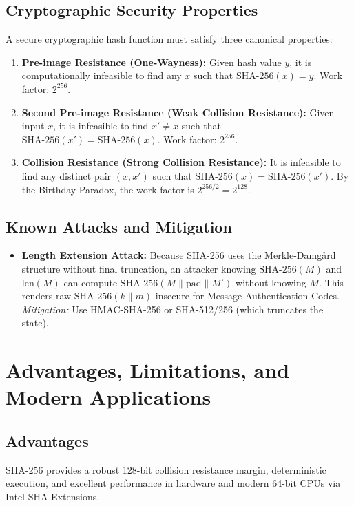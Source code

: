 \subsection{Cryptographic Security Properties}
A secure cryptographic hash function must satisfy three canonical properties:
\begin{enumerate}
    \item \textbf{Pre-image Resistance (One-Wayness):} Given hash value $y$, it is computationally infeasible to find any $x$ such that $\text{SHA-256}(x) = y$. Work factor: $2^{256}$.
    \item \textbf{Second Pre-image Resistance (Weak Collision Resistance):} Given input $x$, it is infeasible to find $x' \ne x$ such that $\text{SHA-256}(x') = \text{SHA-256}(x)$. Work factor: $2^{256}$.
    \item \textbf{Collision Resistance (Strong Collision Resistance):} It is infeasible to find any distinct pair $(x, x')$ such that $\text{SHA-256}(x) = \text{SHA-256}(x')$. By the Birthday Paradox, the work factor is $2^{256/2} = 2^{128}$.
\end{enumerate}

\subsection{Known Attacks and Mitigation}
\begin{itemize}
    \item \textbf{Length Extension Attack:} Because SHA-256 uses the Merkle-Damg{\aa}rd structure without final truncation, an attacker knowing $\text{SHA-256}(M)$ and $\text{len}(M)$ can compute $\text{SHA-256}(M \parallel \text{pad} \parallel M')$ without knowing $M$. This renders raw $\text{SHA-256}(k \parallel m)$ insecure for Message Authentication Codes. \emph{Mitigation:} Use HMAC-SHA-256 or SHA-512/256 (which truncates the state).
\end{itemize}

\section{Advantages, Limitations, and Modern Applications}
\subsection{Advantages}
SHA-256 provides a robust 128-bit collision resistance margin, deterministic execution, and excellent performance in hardware and modern 64-bit CPUs via Intel SHA Extensions.

